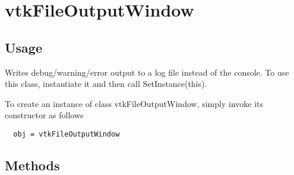\section{vtkFileOutputWindow}

\subsection{Usage}

 Writes debug/warning/error output to a log file instead of the console.
 To use this class, instantiate it and then call SetInstance(this).
 

To create an instance of class vtkFileOutputWindow, simply
invoke its constructor as follows
\begin{verbatim}
  obj = vtkFileOutputWindow
\end{verbatim}
\subsection{Methods}

